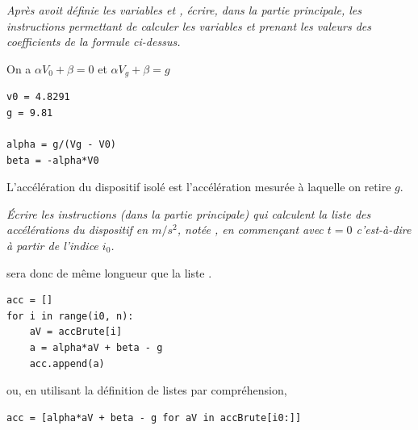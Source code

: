 \begin{Exercise}\it 
Après avoit définie les variables  et , écrire, dans la partie principale, les instructions permettant de calculer les variables  et  prenant les valeurs des coefficients de la formule ci-dessus.
\end{Exercise}
\begin{Answer} On a $\alpha V_0 + \beta = 0$ et $\alpha V_g + \beta = g$
\begin{lstlisting}
v0 = 4.8291
g = 9.81

alpha = g/(Vg - V0)
beta = -alpha*V0
\end{lstlisting}
\end{Answer}

L'accélération du dispositif isolé est l'accélération mesurée à laquelle on retire $g$.
\begin{Exercise}\it 
Écrire les instructions (dans la partie principale) qui calculent la liste des accélérations du dispositif en $m/s^2$, notée , en commençant avec $t=0$ c'est-à-dire à partir de l'indice $i_0$.

 sera donc de même longueur que la liste .
\end{Exercise}
\begin{Answer}
\begin{lstlisting}
acc = []
for i in range(i0, n):
    aV = accBrute[i]
    a = alpha*aV + beta - g
    acc.append(a)
\end{lstlisting}

ou, en utilisant la définition de listes par compréhension,
\begin{lstlisting}
acc = [alpha*aV + beta - g for aV in accBrute[i0:]]
\end{lstlisting}
\end{Answer}
\medskip

